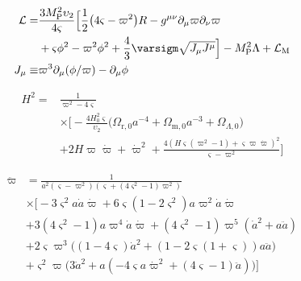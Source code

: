 \documentclass[aps,prd,reprint,preprintnumbers,showpacs,floatfix,nofootinbib,superscriptaddress]{revtex4-2}
\newcommand{\Mp}{M_\mathrm{P}^2}
\begin{document}
\begin{equation}
		\begin{align}
				\mathcal{L} = & \frac{3 \Mp \upsilon_2}{4 \varsigma}\Big[ \frac{1}{2} \big( 4 \varsigma - \varpi^2\big) R - g^{\mu\nu}\partial_\mu \varpi \partial_\nu \varpi \\
							  & + \varsigma \phi^2 - \varpi^2 \phi^2 + \frac{4}{3}\varsigm \sqrt{J_\mu J^\mu} \Big] - \Mp \Lambda + \mathcal{L}_\mathrm{M}\\
						J_\mu \equiv & \varpi^3 \partial_\mu (\phi/\varpi) - \partial_\mu \phi
		\end{align}
\end{equation}

\begin{equation}
		\begin{align}
				H^2 = & \frac{1}{\varpi^2-4\varsigma} \\
					  & \times \Bigg[-\frac{4 H_0^2\varsigma}{\upsilon_2}\Big(\Omega_{\mathrm{r},0}a^{-4}+\Omega_{\mathrm{m},0}a^{-3}+\Omega_{\Lambda,0}\Big) \\
						& + 2 H \varpi\dot{\varpi} + \dot{\varpi}^2  + \frac{4\left(H\varsigma\left(\varpi^2-1\right)+\varsigma\varpi\dot{\varpi}\right)^2}{\varsigma-\varpi^2}\Bigg]
						\end{align}
\end{equation}

\begin{equation}
		\begin{aligned}
				\ddot{\varpi} & =\frac{1}{a^2\left(\varsigma-\varpi^2\right)\left(\varsigma+\left(4\varsigma^2-1\right)\varpi^2\right)} \\
							  & \times \Bigg[-3\varsigma^2 a \dot a \dot{\varpi} + 6\varsigma\left(1-2\varsigma^2\right)a\varpi^2\dot a\dot{\varpi} \\
							  & +3\left(4\varsigma^2-1\right)a\varpi^4\dot a\dot{\varpi}+\left(4\varsigma^2-1\right)\varpi^5\left(\dot a^2+a\ddot a\right) \\
							  &+2\varsigma\varpi^3\Big(\left(1-4\varsigma\right)\dot a^2+\left(1-2\varsigma(1+\varsigma)\right)a\ddot a\Big)\\
							  & +\varsigma^2\varpi\Big(3\dot a^2+a\left(-4\varsigma a\dot{\varpi}^2+\left(4\varsigma-1\right)\ddot a\right)\Big) \Bigg]
				
		\end{aligned}
\end{equation}
\end{document}
